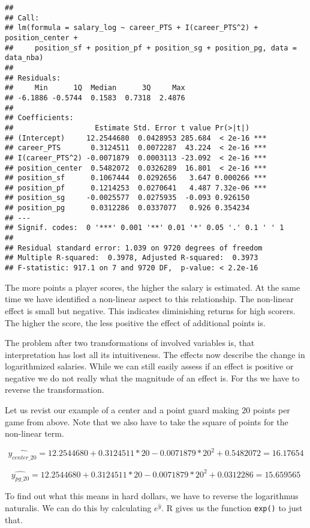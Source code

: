 \documentclass[
]{book}
\begin{document}
\begin{verbatim}
## 
## Call:
## lm(formula = salary_log ~ career_PTS + I(career_PTS^2) + position_center + 
##     position_sf + position_pf + position_sg + position_pg, data = data_nba)
## 
## Residuals:
##     Min      1Q  Median      3Q     Max 
## -6.1886 -0.5744  0.1583  0.7318  2.4876 
## 
## Coefficients:
##                   Estimate Std. Error t value Pr(>|t|)    
## (Intercept)     12.2544680  0.0428953 285.684  < 2e-16 ***
## career_PTS       0.3124511  0.0072287  43.224  < 2e-16 ***
## I(career_PTS^2) -0.0071879  0.0003113 -23.092  < 2e-16 ***
## position_center  0.5482072  0.0326289  16.801  < 2e-16 ***
## position_sf      0.1067444  0.0292656   3.647 0.000266 ***
## position_pf      0.1214253  0.0270641   4.487 7.32e-06 ***
## position_sg     -0.0025577  0.0275935  -0.093 0.926150    
## position_pg      0.0312286  0.0337077   0.926 0.354234    
## ---
## Signif. codes:  0 '***' 0.001 '**' 0.01 '*' 0.05 '.' 0.1 ' ' 1
## 
## Residual standard error: 1.039 on 9720 degrees of freedom
## Multiple R-squared:  0.3978, Adjusted R-squared:  0.3973 
## F-statistic: 917.1 on 7 and 9720 DF,  p-value: < 2.2e-16
\end{verbatim}

The more points a player scores, the higher the salary is estimated. At the same
time we have identified a non-linear aspect to this relationship. The non-linear
effect is small but negative. This indicates diminishing returns for high
scorers. The higher the score, the less positive the effect of additional points
is.

The problem after two transformations of involved variables is, that
interpretation has lost all its intuitiveness. The effects now describe the
change in logarithmized salaries. While we can still easily assess if an effect
is positive or negative we do not really what the magnitude of an effect is. For
ths we have to reverse the transformation.

Let us revist our example of a center and a point guard making \(20\) points
per game from above. Note that we also have to take the square of points for the
non-linear term.

\[\hat{y_{center\_20}} = 12.2544680 + 0.3124511 * 20 - 0.0071879 * 20^2 + 0.5482072 = 16.17654\]

\[\hat{y_{pg\_20}} = 12.2544680 + 0.3124511 * 20 - 0.0071879 * 20^2 + 0.0312286 = 15.659565\]

To find out what this means in hard dollars, we have to reverse the logarithmus
naturalis. We can do this by calculating \(e^\hat{y}\). R gives us the function
\texttt{exp()} to just that.
\end{document}

